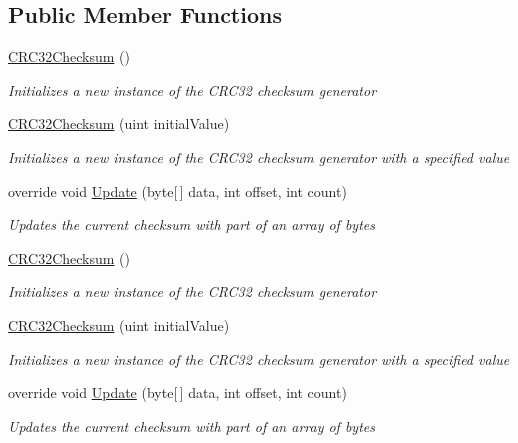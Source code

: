 \subsection*{Public Member Functions}
\begin{DoxyCompactItemize}
\item 
\hyperlink{class_dot_z_lib_1_1_c_r_c32_checksum_aae1fb7dbf6c57d17c321d0065cd608ca}{C\+R\+C32\+Checksum} ()
\begin{DoxyCompactList}\small\item\em Initializes a new instance of the C\+R\+C32 checksum generator \end{DoxyCompactList}\item 
\hyperlink{class_dot_z_lib_1_1_c_r_c32_checksum_a7032fdb98254bd918ff19b5251c29634}{C\+R\+C32\+Checksum} (uint initial\+Value)
\begin{DoxyCompactList}\small\item\em Initializes a new instance of the C\+R\+C32 checksum generator with a specified value \end{DoxyCompactList}\item 
override void \hyperlink{class_dot_z_lib_1_1_c_r_c32_checksum_abe29e66033fa164a7c7c0463e6c88074}{Update} (byte\mbox{[}$\,$\mbox{]} data, int offset, int count)
\begin{DoxyCompactList}\small\item\em Updates the current checksum with part of an array of bytes \end{DoxyCompactList}\item 
\hyperlink{class_dot_z_lib_1_1_c_r_c32_checksum_aae1fb7dbf6c57d17c321d0065cd608ca}{C\+R\+C32\+Checksum} ()
\begin{DoxyCompactList}\small\item\em Initializes a new instance of the C\+R\+C32 checksum generator \end{DoxyCompactList}\item 
\hyperlink{class_dot_z_lib_1_1_c_r_c32_checksum_a7032fdb98254bd918ff19b5251c29634}{C\+R\+C32\+Checksum} (uint initial\+Value)
\begin{DoxyCompactList}\small\item\em Initializes a new instance of the C\+R\+C32 checksum generator with a specified value \end{DoxyCompactList}\item 
override void \hyperlink{class_dot_z_lib_1_1_c_r_c32_checksum_abe29e66033fa164a7c7c0463e6c88074}{Update} (byte\mbox{[}$\,$\mbox{]} data, int offset, int count)
\begin{DoxyCompactList}\small\item\em Updates the current checksum with part of an array of bytes \end{DoxyCompactList}\end{DoxyCompactItemize}

